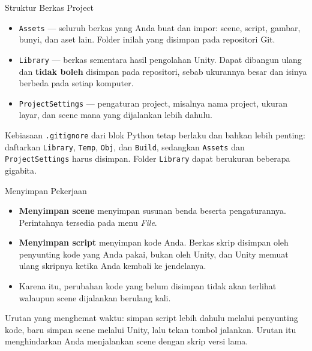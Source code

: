 \documentclass[aspectratio=169,10pt]{beamer}
\begin{document}
\begin{frame}{Struktur Berkas Project}
\begin{itemize}
  \item \texttt{Assets} --- seluruh berkas yang Anda buat dan impor: scene,
        script, gambar, bunyi, dan aset lain. Folder inilah yang disimpan pada
        repositori Git.
  \item \texttt{Library} --- berkas sementara hasil pengolahan Unity. Dapat
        dibangun ulang dan \textbf{tidak boleh} disimpan pada repositori,
        sebab ukurannya besar dan isinya berbeda pada setiap komputer.
  \item \texttt{ProjectSettings} --- pengaturan project, misalnya nama
        project, ukuran layar, dan scene mana yang dijalankan lebih dahulu.
\end{itemize}
\vspace{0.14cm}
\begin{peringatan}
Kebiasaan \texttt{.gitignore} dari blok Python tetap berlaku dan bahkan lebih
penting: daftarkan \texttt{Library}, \texttt{Temp}, \texttt{Obj}, dan
\texttt{Build}, sedangkan \texttt{Assets} dan \texttt{ProjectSettings} harus
disimpan. Folder \texttt{Library} dapat berukuran beberapa gigabita.
\end{peringatan}
\end{frame}

\begin{frame}{Menyimpan Pekerjaan}
\begin{itemize}
  \item \textbf{Menyimpan scene} menyimpan susunan benda beserta pengaturannya.
        Perintahnya tersedia pada menu \emph{File}.
  \item \textbf{Menyimpan script} menyimpan kode Anda. Berkas skrip disimpan
        oleh penyunting kode yang Anda pakai, bukan oleh Unity, dan Unity
        memuat ulang skripnya ketika Anda kembali ke jendelanya.
  \item Karena itu, perubahan kode yang belum disimpan tidak akan terlihat
        walaupun scene dijalankan berulang kali.
\end{itemize}
\vspace{0.16cm}
\begin{kiat}
Urutan yang menghemat waktu: simpan script lebih dahulu melalui penyunting
kode, baru simpan scene melalui Unity, lalu tekan tombol jalankan. Urutan itu
menghindarkan Anda menjalankan scene dengan skrip versi lama.
\end{kiat}
\end{frame}
\end{document}
